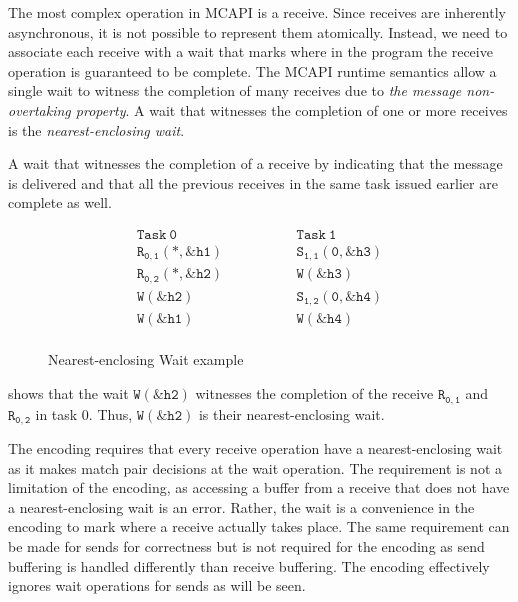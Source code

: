 The most complex operation in MCAPI is a receive. Since receives are
inherently asynchronous, it is not possible to represent them
atomically. Instead, we need to associate each receive with a wait
that marks where in the program the receive operation is guaranteed to be
complete. The MCAPI runtime semantics allow a single wait to witness the completion of many receives due to \emph{the message
  non-overtaking property}. A wait that witnesses the completion of
one or more receives is the \emph{nearest-enclosing wait}.

\begin{definition} \label{def:nw}
A wait that witnesses the completion of a receive by indicating that
the message is delivered and that all the previous receives in the
same task issued earlier are complete as well.
\end{definition}

\begin{figure}[h]
\[
\begin{array}{l|l}
\;\;\;\;\;\;\;\;\mathtt{Task\ 0}\;\;\;\;\;\;\;\; & \;\;\;\;\;\;\;\; \mathtt{Task\ 1}\;\;\;\;\;\;\;\; \\
\hline
\;\;\;\;\;\;\;\;\mathtt{R_{0,1}(*,\&h1)}\;\;\;\;\;\;\;\; & \;\;\;\;\;\;\;\; \mathtt{S_{1,1}(0,\&h3)}\;\;\;\;\;\;\;\; \\
\;\;\;\;\;\;\;\;\mathtt{R_{0,2}(*,\&h2)}\;\;\;\;\;\;\;\; & \;\;\;\;\;\;\;\; \mathtt{W{(\&h3)}}\;\;\;\;\;\;\;\; \\
\;\;\;\;\;\;\;\;\mathtt{W{(\&h2)}}\;\;\;\;\;\;\;\; & \;\;\;\;\;\;\;\; \mathtt{S_{1,2}(0,\&h4)}\;\;\;\;\;\;\;\; \\
\;\;\;\;\;\;\;\;\mathtt{W{(\&h1)}}\;\;\;\;\;\;\;\; & \;\;\;\;\;\;\;\; \mathtt{W{(\&h4)}}\;\;\;\;\;\;\;\; \\
\end{array}
\]
\caption{Nearest-enclosing Wait example} \label{fig:nw}
\end{figure}

 shows that the wait $\mathtt{W{(\&h2)}}$
witnesses the completion of the receive $\mathtt{R_{0,1}}$ and
$\mathtt{R_{0,2}}$ in task 0. Thus, $\mathtt{W{(\&h2)}}$ is their
nearest-enclosing wait.

The encoding requires that every receive operation have a
nearest-enclosing wait as it makes match pair decisions at the wait
operation. The requirement is not a limitation of the encoding, as
accessing a buffer from a receive that does not have a
nearest-enclosing wait is an error. Rather, the wait is a convenience
in the encoding to mark where a receive actually takes place. The same
requirement can be made for sends for correctness but is not required
for the encoding as send buffering is handled differently than receive
buffering.  The encoding effectively ignores wait operations for sends
as will be seen.

